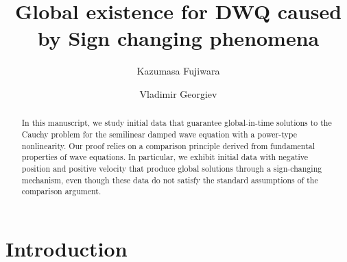 \documentclass[reqno]{amsart}
\begin{document}
\title{Global existence for DWQ caused by Sign changing  phenomena}
\author[K.Fujiwara]{Kazumasa Fujiwara }
\address[K. Fujiwara]{
	Faculty of Advanced Science and Technology,
	Ryukoku University,
	1-5 Yokotani,Seta Oe-cho,Otsu,Shiga,
	520-2194, Japan
}


\author[V.Georgiev]{Vladimir Georgiev}
\address[V.Georgiev]{
Department of Mathematics,
University of Pisa,
Largo Bruno Pontecorvo 5,
I - 56127 Pisa, Italy}
\address{
Faculty of Science and Engineering, Waseda University,
3-4-1, Okubo, Shinjuku-ku, Tokyo 169-8555, Japan}
\address{
Institute of Mathematics and Informatics,  Bulgarian Academy of Sciences, Acad. Georgi Bonchev Str., Block 8, Sofia, 1113, Bulgaria
}


\begin{abstract}
In this manuscript, we study initial data
that guarantee global-in-time solutions to the Cauchy problem
for the semilinear damped wave equation
with a power-type nonlinearity.
Our proof relies on a comparison principle derived from
fundamental properties of wave equations.
In particular, we exhibit initial data
with negative position and positive velocity
that produce global solutions through a sign-changing mechanism,
even though these data do not satisfy
the standard assumptions of the comparison argument.
\end{abstract}

\maketitle

\section{Introduction}
\end{document}
